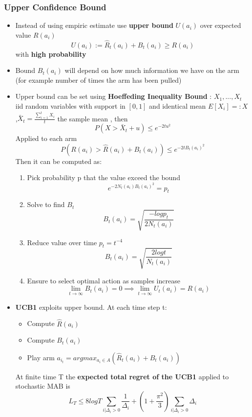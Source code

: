 \documentclass[12pt]{article} %
\begin{document}
\subsubsection{Upper Confidence Bound}
\begin{itemize}
\item Instead of using empiric estimate use \textbf{upper bound} $U(a_i)$ over expected value $R(a_i)$
$$ U(a_i):= \hat{R}_t(a_i) + B_t(a_i) \geq R(a_i)$$
with \textbf{high probability}
\item Bound $B_t(a_i)$ will depend on how much information we have on the arm (for example number of times the arm has been pulled)

\item Upper bound can be set using \textbf{Hoeffeding Inequality Bound} : 
$X_1,...,X_t$ iid random variables with support in $[0,1]$  and identical mean 
$E[X_i]=: X$ ,$\bar{X}_t = \frac{\sum_{i=1}^t X_i}{t}$ the sample mean , then
$$ P(X > \bar{X}_t + u ) \leq e^{-2tu^2}$$
Applied to each arm
$$ P(R(a_i) > \hat{R}(a_i) + B_t(a_i) ) \leq e^{-2tB_t(a_i)^2}$$
Then it can be computed as:
\begin{enumerate}
\item Pick probability p that the value exceed the bound
$$ e^{-2N_t(a_i)B_t(a_i)^2} = p_t $$
\item Solve to find $B_t$
$$ B_t(a_i) = \sqrt{\frac{-log p_t}{2N_t(a_i)}}$$ 
\item Reduce value over time $p_t = t^{-4}$
$$ B_t(a_i) = \sqrt{\frac{2log t}{N_t(a_i)}}$$ 
\item Ensure to select optimal action as samples increase
$$ \lim_{t \to \infty }B_t(a_i) = 0 \implies \lim_{t \to \infty}U_t(a_i) = R(a_i)$$
\end{enumerate}

\item \textbf{UCB1} exploits upper bound. At each time step t:
\begin{itemize}
\item Compute $\hat{R}(a_i)$
\item Compute $B_t(a_i)$
\item Play arm $a_{i_t} = argmax_{a_i \in A}\left( \hat{R}_t(a_i) +B_t(a_i) \right)$
\end{itemize}

At finite time T the \textbf{expected total regret of the UCB1} applied to stochastic MAB is
$$ L_T \leq 8log T \sum_{i|\Delta_i > 0} \frac{1}{\Delta_i}+(1+\frac{\pi^2}{3})\sum_{i|\Delta_i > 0} \Delta_i$$



\end{itemize}
\end{document}
